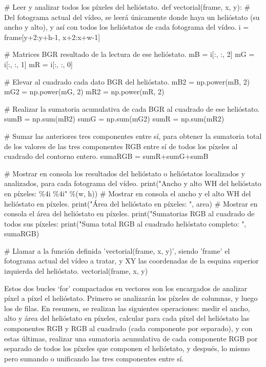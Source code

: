 \documentclass[12pt]{article}
\begin{document}
            \# Leer y analizar todos los píxeles del helióstato.
            def vectorial(frame, x, y):
                \# Del fotograma actual del vídeo, se leerá únicamente donde haya un helióstato (su ancho y alto), y así con todos los helióstatos de cada fotograma del vídeo.
                i = frame[y+2:y+h-1, x+2:x+w-1]
                
                \# Matrices BGR resultado de la lectura de ese helióstato.
                mB = i[:, :, 2]
                mG = i[:, :, 1]
                mR = i[:, :, 0]
                                
                \# Elevar al cuadrado cada dato BGR del helióstato.
                mB2 = np.power(mB, 2)
                mG2 = np.power(mG, 2)
                mR2 = np.power(mR, 2)

                \# Realizar la sumatoria acumulativa de cada BGR al cuadrado de ese helióstato.
                sumB = np.sum(mB2)
                sumG = np.sum(mG2)
                sumR = np.sum(mR2)

                \# Sumar las anteriores tres componentes entre sí, para obtener la sumatoria total de los valores de las tres componentes RGB entre sí de todos los píxeles al cuadrado del contorno entero.
                sumaRGB = sumR+sumG+sumB
                
                \# Mostrar en consola los resultados del helióstato o helióstatos localizados y analizados, para cada fotograma del vídeo.
                print("Ancho y alto WH del helióstato en píxeles:       \%4i \%4i" \%(w, h)) \# Mostrar en consola el ancho y el alto WH del helióstato en píxeles.
                print("Área del helióstato en píxeles:                  ", area) \# Mostrar en consola el área del helióstato en píxeles.
                print("Sumatorias RGB al cuadrado de todos sus píxeles: %
                print("Suma total RGB al cuadrado helióstato completo:  ", sumaRGB)

            \# Llamar a la función definida 'vectorial(frame, x, y)', siendo 'frame' el fotograma actual del vídeo a tratar, y XY las coordenadas de la esquina superior izquierda del helióstato.
            vectorial(frame, x, y)
        
Estos dos bucles ‘for’ compactados en vectores son los encargados de analizar píxel a píxel el helióstato. Primero se analizarán los píxeles de columnas, y luego los de filas. En resumen, se realizan las siguientes operaciones: medir el ancho, alto y área del helióstato en píxeles, calcular para cada píxel del helióstato las componentes RGB y RGB al cuadrado (cada componente por separado), y con estas últimas, realizar una sumatoria acumulativa de cada componente RGB por separado de todos los píxeles que componen el helióstato, y después, lo mismo pero sumando o unificando las tres componentes entre sí.
\end{document}

